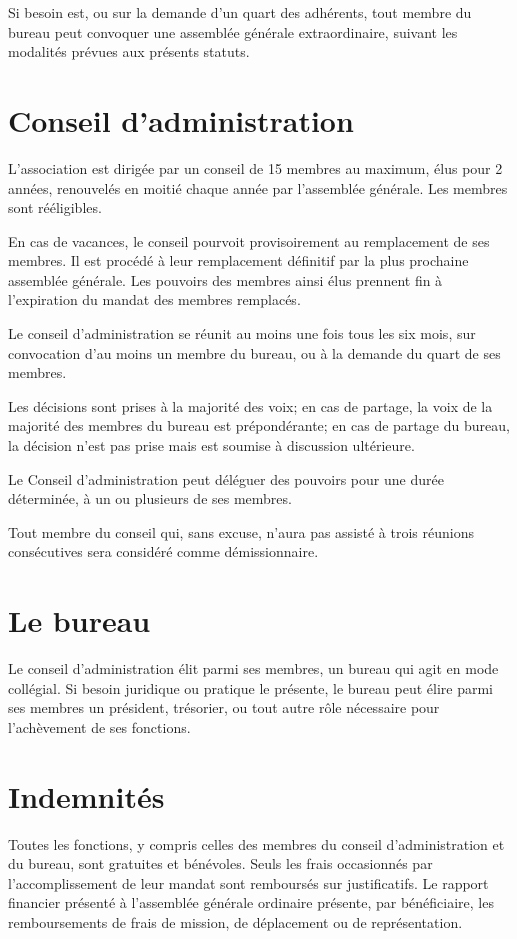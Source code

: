 \documentclass[11 pt]{article}
\begin{document}
Si besoin est, ou sur la demande d'un quart des adhérents, tout membre
du bureau peut convoquer une assemblée générale extraordinaire,
suivant les modalités prévues aux présents statuts.

\section{Conseil d'administration}

L'association est dirigée par un conseil de 15 membres au maximum,
élus pour 2 années, renouvelés en moitié chaque année par l'assemblée
générale. Les membres sont rééligibles.

En cas de vacances, le conseil pourvoit provisoirement au remplacement
de ses membres. Il est procédé à leur remplacement définitif par la
plus prochaine assemblée générale. Les pouvoirs des membres ainsi élus
prennent fin à l'expiration du mandat des membres remplacés.

Le conseil d'administration se réunit au moins une fois tous les six
mois, sur convocation d'au moins un membre du bureau, ou à la demande
du quart de ses membres.

Les décisions sont prises à la majorité des voix; en cas de partage,
la voix de la majorité des membres du bureau est prépondérante; en cas
de partage du bureau, la décision n'est pas prise mais est soumise à
discussion ultérieure.

Le Conseil d'administration peut déléguer des pouvoirs pour une durée
déterminée, à un ou plusieurs de ses membres.

Tout membre du conseil qui, sans excuse, n'aura pas assisté à trois
réunions consécutives sera considéré comme démissionnaire.


\section{Le bureau}

Le conseil d'administration élit parmi ses membres, un bureau qui agit
en mode collégial.  Si besoin juridique ou pratique le présente, le
bureau peut élire parmi ses membres un président, trésorier, ou tout
autre rôle nécessaire pour l'achèvement de ses fonctions.

\section{Indemnités}

Toutes les fonctions, y compris celles des membres du conseil
d’administration et du bureau, sont gratuites et bénévoles. Seuls les
frais occasionnés par l’accomplissement de leur mandat sont remboursés
sur justificatifs. Le rapport financier présenté à l’assemblée
générale ordinaire présente, par bénéficiaire, les remboursements de
frais de mission, de déplacement ou de représentation.
\end{document}
